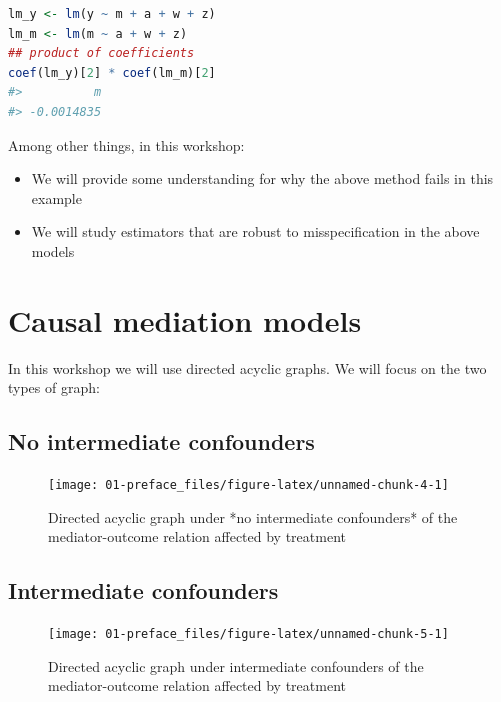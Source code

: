 \documentclass[
  12pt,
]{book}
\providecommand{\tightlist}{%
  \setlength{\itemsep}{0pt}\setlength{\parskip}{0pt}}
\theoremstyle{definition}
\theoremstyle{definition}
\theoremstyle{definition}
\newcommand{\1}{\mathbbm{1}}
\begin{document}
\begin{lstlisting}[language=R]
lm_y <- lm(y ~ m + a + w + z)
lm_m <- lm(m ~ a + w + z)
## product of coefficients
coef(lm_y)[2] * coef(lm_m)[2]
#>          m 
#> -0.0014835
\end{lstlisting}

Among other things, in this workshop:

\begin{itemize}
\tightlist
\item
  We will provide some understanding for why the above method fails in this
  example
\item
  We will study estimators that are robust to misspecification in the above
  models
\end{itemize}

\hypertarget{causal-mediation-models}{%
\section{Causal mediation models}\label{causal-mediation-models}}

In this workshop we will use directed acyclic graphs. We will focus on the two
types of graph:

\hypertarget{no-intermediate-confounders}{%
\subsection{No intermediate confounders}\label{no-intermediate-confounders}}

\begin{figure}

{\centering \texttt{[image: 01-preface\_files/figure-latex/unnamed-chunk-4-1]} 

}

\caption{Directed acyclic graph under *no intermediate confounders* of the mediator-outcome relation affected by treatment}\label{fig:unnamed-chunk-4}
\end{figure}

\hypertarget{intermediate-confounders}{%
\subsection{Intermediate confounders}\label{intermediate-confounders}}

\begin{figure}

{\centering \texttt{[image: 01-preface\_files/figure-latex/unnamed-chunk-5-1]} 

}

\caption{Directed acyclic graph under intermediate confounders of the mediator-outcome relation affected by treatment}\label{fig:unnamed-chunk-5}
\end{figure}
\end{document}
